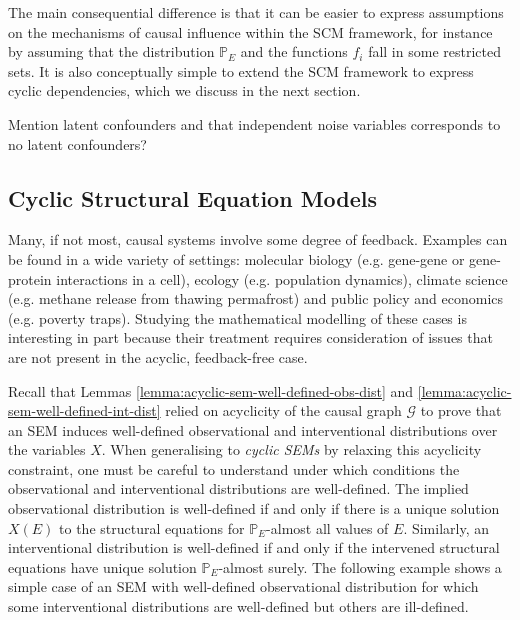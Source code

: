 The main consequential difference is that it can be easier to express assumptions on the mechanisms of causal influence within the SCM framework, for instance by assuming that the distribution $\mathbb{P}_E$ and the functions $f_i$ fall in some restricted sets.
It is also conceptually simple to extend the SCM framework to express cyclic dependencies, which we discuss in the next section.


Mention latent confounders and that independent noise variables corresponds to no latent confounders?

\subsection{Cyclic Structural Equation Models}

Many, if not most, causal systems involve some degree of feedback. 
Examples can be found in a wide variety of settings: molecular biology (e.g. gene-gene or gene-protein interactions in a cell), ecology (e.g. population dynamics), climate science (e.g. methane release from thawing permafrost) and public policy and economics (e.g. poverty traps).
Studying the mathematical modelling of these cases is interesting in part because their treatment requires consideration of issues that are not present in the acyclic, feedback-free case.

Recall that Lemmas \ref{lemma:acyclic-sem-well-defined-obs-dist} and \ref{lemma:acyclic-sem-well-defined-int-dist} relied on acyclicity of the causal graph $\mathcal{G}$ to prove that an SEM induces well-defined observational and interventional distributions over the variables $X$. 
When generalising to \emph{cyclic SEMs} by relaxing this acyclicity constraint, one must be careful to understand under which conditions the observational and interventional distributions are well-defined.
The implied observational distribution is well-defined if and only if there is a unique solution $X(E)$ to the structural equations for $\mathbb{P}_E$-almost all values of $E$. Similarly, an interventional distribution is well-defined if and only if the intervened structural equations have unique solution $\mathbb{P}_E$-almost surely.
The following example shows a simple case of an SEM with well-defined observational distribution for which some interventional distributions are well-defined but others are ill-defined.

